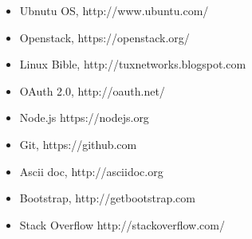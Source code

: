 \documentclass[12pt]{report}
\begin{document}
\begin{itemize}
\item Ubnutu OS, http://www.ubuntu.com/
\item Openstack, https://openstack.org/
\item Linux Bible, http://tuxnetworks.blogspot.com
\item OAuth 2.0, http://oauth.net/
\item Node.js https://nodejs.org
\item Git, https://github.com
\item Ascii doc, http://asciidoc.org
\item Bootstrap, http://getbootstrap.com 
\item Stack Overflow http://stackoverflow.com/

\end{itemize}
		
\end{document}
